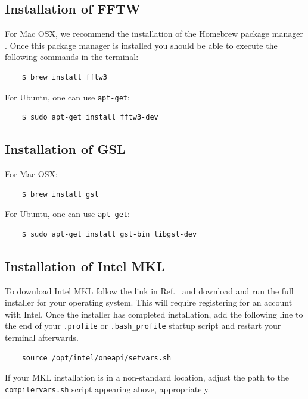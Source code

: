 \documentclass[times,sort&compress,final]{elsarticle}
\begin{document}
\subsection{Installation of FFTW}
\label{subsec:installfftw3}

\vspace{2mm}

For Mac OSX, we recommend the installation of the Homebrew package manager \cite{homebrew}.  Once this package manager is installed you should be able to execute the following commands in the terminal:
%
\begin{verbatim}
    $ brew install fftw3
\end{verbatim}
%
For Ubuntu, one can use {\tt apt-get}:
%
\begin{verbatim}
    $ sudo apt-get install fftw3-dev
\end{verbatim}

\subsection{Installation of GSL}
\label{subsec:installgsl}

\vspace{2mm}

For Mac OSX:
%
\begin{verbatim}
    $ brew install gsl
\end{verbatim}
%
For Ubuntu, one can use {\tt apt-get}:
%
\begin{verbatim}
    $ sudo apt-get install gsl-bin libgsl-dev
\end{verbatim}

\subsection{Installation of Intel MKL}
\label{subsec:installmkl}

\vspace{2mm}

To download Intel MKL follow the link in Ref.~\cite{IntelOneAPI} and download and run the full installer for your operating system.  This will require registering for an account with Intel.  Once the installer has completed installation, add the following line to the end of your {\tt .profile} or {\tt .bash\_profile} startup script and restart your terminal afterwards.
%
\begin{verbatim}
    source /opt/intel/oneapi/setvars.sh
\end{verbatim}
%
If your MKL installation is in a non-standard location, adjust the path to the {\tt compilervars.sh} script appearing above, appropriately.
\end{document}
